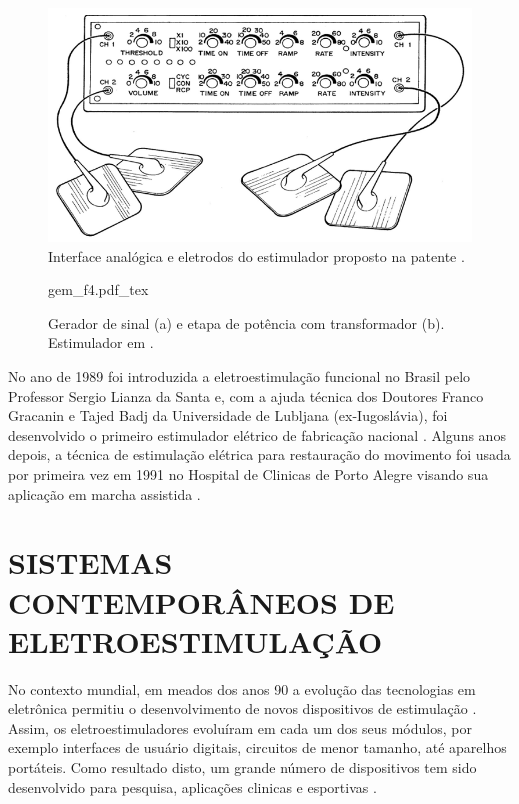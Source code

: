 \begin{figure}
    \centering %
    \includegraphics[width=0.7\linewidth]{figs/Fig_c3/ian_f3}
    \caption{Interface analógica e eletrodos do estimulador proposto na patente  \cite{Reiss1996CombinationSystem}.}
    \label{fig:ian_f3}
\end{figure}

\vspace{0.3cm}
\begin{figure}[h]
    \centering %
    \small %
    \def\svgwidth{0.9\columnwidth}%
    {gem_f4.pdf_tex}
    \caption{Gerador de sinal (a) e etapa de potência com transformador (b). Estimulador em  \cite{Phillips1980ApparatusTES}.}
    \label{fig:gem_f4}
\end{figure}

No ano de 1989 foi introduzida a eletroestimulação funcional no Brasil pelo Professor Sergio Lianza da Santa e, com a ajuda técnica dos Doutores Franco Gracanin e Tajed Badj da Universidade de Lubljana (ex-Iugoslávia), foi desenvolvido o primeiro estimulador elétrico de fabricação nacional \cite{Santos1995EquipamentosFuncional}. Alguns anos depois, a técnica de estimulação elétrica para restauração do movimento foi usada por primeira vez em 1991 no Hospital de Clinicas de Porto Alegre visando sua aplicação em marcha assistida \cite{Santos1995EquipamentosFuncional}.

\section{SISTEMAS CONTEMPORÂNEOS DE ELETROESTIMULAÇÃO}

No contexto mundial, em meados dos anos 90 a evolução das tecnologias em eletrônica permitiu o desenvolvimento de novos dispositivos de estimulação \cite{Wu2002AApplications}. Assim, os eletroestimuladores evoluíram em cada um dos seus módulos, por exemplo interfaces de usuário digitais, circuitos de menor tamanho, até aparelhos portáteis. Como resultado disto, um grande número de dispositivos tem sido desenvolvido para pesquisa, aplicações clinicas e esportivas \cite{Popovic2004CompexApplications}.

